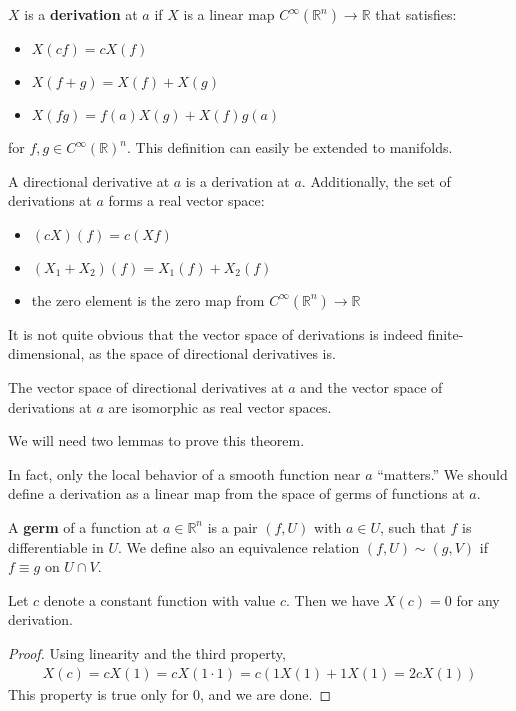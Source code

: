 \documentclass{../mathnotes}
\begin{document}
\begin{defn}
    $X$ is a \textbf{derivation} at $a$ if $X$ is a linear map $C^\infty(\mathbb{R}^n)\to\mathbb{R}$ that satisfies:
    \begin{itemize}
        \item $X(cf)=cX(f)$
        \item $X(f+g)=X(f)+X(g)$
        \item $X(fg)=f(a)X(g)+X(f)g(a)$
    \end{itemize}
    for $f,g\in C^\infty(\mathbb{R})^n$. This definition can easily be extended to manifolds.
\end{defn}

\begin{rem}
    A directional derivative at $a$ is a derivation at $a$. Additionally, the set of derivations at $a$ forms a real vector space:
    \begin{itemize}
        \item $(cX)(f)=c(Xf)$
        \item $(X_1+X_2)(f)=X_1(f)+X_2(f)$
        \item the zero element is the zero map from $C^\infty(\mathbb{R}^n)\to\mathbb{R}$
    \end{itemize}
\end{rem}

It is not quite obvious that the vector space of derivations is indeed finite-dimensional, as the space of directional derivatives is.

\begin{thm}
    The vector space of directional derivatives at $a$ and the vector space of derivations at $a$ are isomorphic as real vector spaces.
\end{thm}

We will need two lemmas to prove this theorem.

\begin{rem}
    In fact, only the local behavior of a smooth function near $a$ ``matters.'' We should define a derivation as a linear map from the space of germs of
    functions at $a$.
\end{rem}

\begin{defn}
    A \textbf{germ} of a function at $a\in\mathbb{R}^n$ is a pair $(f,U)$ with $a\in U$, such that $f$ is differentiable in $U$. We define also an equivalence
    relation $(f,U)\sim(g,V)$ if $f\equiv g$ on $U\cap V$.
\end{defn}

\begin{lem}
    Let $c$ denote a constant function with value $c$. Then we have $X(c)=0$ for any derivation.
\end{lem}
\begin{proof}
    Using linearity and the third property,
    \begin{align*}
        X(c)=cX(1) = cX(1\cdot 1)=c\left( 1X(1)+1X(1)=2cX(1) \right)
    \end{align*}
    This property is true only for 0, and we are done.
\end{proof}
\end{document}
